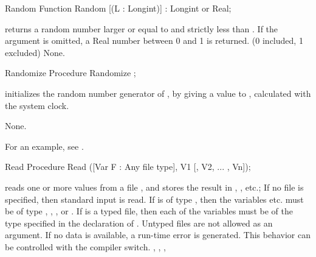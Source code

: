 \documentclass{report}
\begin{document}

\begin{function}{Random}
\Declaration
Function Random [(L : Longint)] : Longint or Real;

\Description
{} returns a random number larger or equal to  and
strictly less than .
If the argument  is omitted, a Real number between 0 and 1 is returned.
(0 included, 1 excluded)
\Errors
None.
\SeeAlso
{}
\end{function}


\begin{procedure}{Randomize}
\Declaration
Procedure Randomize ;

\Description
{} initializes the random number generator of \fpc, by giving
a value to , calculated with the system clock.

\Errors
None.
\SeeAlso
{}
\end{procedure}
For an example, see .
\begin{procedure}{Read}
\Declaration
Procedure Read ([Var F : Any file type], V1 [, V2, ... , Vn]);

\Description
{} reads one or more values from a file , and stores the
result in , , etc.; If no file  is specified, then
standard input is read.
If  is of type , then the variables  etc. must be
of type , , ,  or .
If  is a typed file, then each of the variables must be of the type
specified in the declaration of . Untyped files are not allowed as an
argument.
\Errors
If no data is available, a run-time error is generated. This behavior can
be controlled with the  compiler switch.
\SeeAlso
{}, , , 
\end{procedure}

\end{document}
